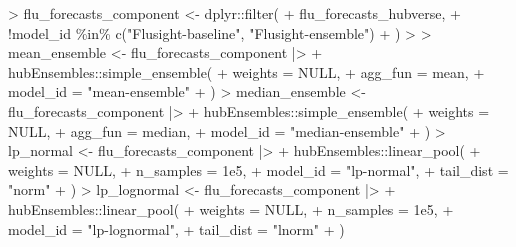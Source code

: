 \documentclass[
  letterpaper,
  DIV=11,
  numbers=noendperiod]{scrartcl}
\newenvironment{Shaded}{\begin{snugshade}}{\end{snugshade}}
\newcommand{\AttributeTok}[1]{\textcolor[rgb]{0.40,0.45,0.13}{#1}}
\newcommand{\ConstantTok}[1]{\textcolor[rgb]{0.56,0.35,0.01}{#1}}
\newcommand{\ErrorTok}[1]{\textcolor[rgb]{0.68,0.00,0.00}{#1}}
\newcommand{\FloatTok}[1]{\textcolor[rgb]{0.68,0.00,0.00}{#1}}
\newcommand{\FunctionTok}[1]{\textcolor[rgb]{0.28,0.35,0.67}{#1}}
\newcommand{\NormalTok}[1]{\textcolor[rgb]{0.00,0.23,0.31}{#1}}
\newcommand{\OtherTok}[1]{\textcolor[rgb]{0.00,0.23,0.31}{#1}}
\newcommand{\SpecialCharTok}[1]{\textcolor[rgb]{0.37,0.37,0.37}{#1}}
\newcommand{\StringTok}[1]{\textcolor[rgb]{0.13,0.47,0.30}{#1}}
\begin{document}
\begin{Shaded}
\begin{Highlighting}[]
\SpecialCharTok{\textgreater{}}\NormalTok{ flu\_forecasts\_component }\OtherTok{\textless{}{-}}\NormalTok{ dplyr}\SpecialCharTok{::}\FunctionTok{filter}\NormalTok{(}
\SpecialCharTok{+}\NormalTok{     flu\_forecasts\_hubverse,}
\SpecialCharTok{+}     \SpecialCharTok{!}\NormalTok{model\_id }\SpecialCharTok{\%in\%} \FunctionTok{c}\NormalTok{(}\StringTok{"Flusight{-}baseline"}\NormalTok{, }\StringTok{"Flusight{-}ensemble"}\NormalTok{)}
\SpecialCharTok{+}\NormalTok{   )}
\SpecialCharTok{\textgreater{}} 
\ErrorTok{\textgreater{}}\NormalTok{ mean\_ensemble }\OtherTok{\textless{}{-}}\NormalTok{ flu\_forecasts\_component }\SpecialCharTok{|\textgreater{}}
\SpecialCharTok{+}\NormalTok{     hubEnsembles}\SpecialCharTok{::}\FunctionTok{simple\_ensemble}\NormalTok{(}
\SpecialCharTok{+}       \AttributeTok{weights =} \ConstantTok{NULL}\NormalTok{,}
\SpecialCharTok{+}       \AttributeTok{agg\_fun =}\NormalTok{ mean,}
\SpecialCharTok{+}       \AttributeTok{model\_id =} \StringTok{"mean{-}ensemble"}
\SpecialCharTok{+}\NormalTok{     )}
\SpecialCharTok{\textgreater{}}\NormalTok{ median\_ensemble }\OtherTok{\textless{}{-}}\NormalTok{ flu\_forecasts\_component }\SpecialCharTok{|\textgreater{}}
\SpecialCharTok{+}\NormalTok{     hubEnsembles}\SpecialCharTok{::}\FunctionTok{simple\_ensemble}\NormalTok{(}
\SpecialCharTok{+}       \AttributeTok{weights =} \ConstantTok{NULL}\NormalTok{,}
\SpecialCharTok{+}       \AttributeTok{agg\_fun =}\NormalTok{ median,}
\SpecialCharTok{+}       \AttributeTok{model\_id =} \StringTok{"median{-}ensemble"}
\SpecialCharTok{+}\NormalTok{     )}
\SpecialCharTok{\textgreater{}}\NormalTok{ lp\_normal }\OtherTok{\textless{}{-}}\NormalTok{ flu\_forecasts\_component }\SpecialCharTok{|\textgreater{}}
\SpecialCharTok{+}\NormalTok{     hubEnsembles}\SpecialCharTok{::}\FunctionTok{linear\_pool}\NormalTok{(}
\SpecialCharTok{+}       \AttributeTok{weights =} \ConstantTok{NULL}\NormalTok{,}
\SpecialCharTok{+}       \AttributeTok{n\_samples =} \FloatTok{1e5}\NormalTok{,}
\SpecialCharTok{+}       \AttributeTok{model\_id =} \StringTok{"lp{-}normal"}\NormalTok{,}
\SpecialCharTok{+}       \AttributeTok{tail\_dist =} \StringTok{"norm"}
\SpecialCharTok{+}\NormalTok{     )}
\SpecialCharTok{\textgreater{}}\NormalTok{ lp\_lognormal }\OtherTok{\textless{}{-}}\NormalTok{ flu\_forecasts\_component }\SpecialCharTok{|\textgreater{}}
\SpecialCharTok{+}\NormalTok{     hubEnsembles}\SpecialCharTok{::}\FunctionTok{linear\_pool}\NormalTok{(}
\SpecialCharTok{+}       \AttributeTok{weights =} \ConstantTok{NULL}\NormalTok{,}
\SpecialCharTok{+}       \AttributeTok{n\_samples =} \FloatTok{1e5}\NormalTok{,}
\SpecialCharTok{+}       \AttributeTok{model\_id =} \StringTok{"lp{-}lognormal"}\NormalTok{,}
\SpecialCharTok{+}       \AttributeTok{tail\_dist =} \StringTok{"lnorm"}
\SpecialCharTok{+}\NormalTok{     ) }
\end{Highlighting}
\end{Shaded}
\end{document}
